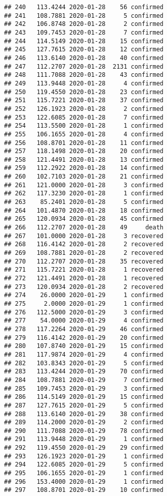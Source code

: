 \documentclass[
]{article}
\begin{document}
\begin{verbatim}
## 240   113.4244 2020-01-28    56 confirmed
## 241   108.7881 2020-01-28     5 confirmed
## 242   106.8748 2020-01-28     2 confirmed
## 243   109.7453 2020-01-28     7 confirmed
## 244   114.5149 2020-01-28    15 confirmed
## 245   127.7615 2020-01-28    12 confirmed
## 246   113.6140 2020-01-28    40 confirmed
## 247   112.2707 2020-01-28  2131 confirmed
## 248   111.7088 2020-01-28    43 confirmed
## 249   113.9448 2020-01-28     4 confirmed
## 250   119.4550 2020-01-28    23 confirmed
## 251   115.7221 2020-01-28    37 confirmed
## 252   126.1923 2020-01-28     2 confirmed
## 253   122.6085 2020-01-28     7 confirmed
## 254   113.5500 2020-01-28     1 confirmed
## 255   106.1655 2020-01-28     4 confirmed
## 256   108.8701 2020-01-28    11 confirmed
## 257   118.1498 2020-01-28    20 confirmed
## 258   121.4491 2020-01-28    13 confirmed
## 259   112.2922 2020-01-28    14 confirmed
## 260   102.7103 2020-01-28    21 confirmed
## 261   121.0000 2020-01-28     3 confirmed
## 262   117.3230 2020-01-28     1 confirmed
## 263    85.2401 2020-01-28     5 confirmed
## 264   101.4870 2020-01-28    18 confirmed
## 265   120.0934 2020-01-28    45 confirmed
## 266   112.2707 2020-01-28    49     death
## 267   101.0000 2020-01-28     3 recovered
## 268   116.4142 2020-01-28     2 recovered
## 269   108.7881 2020-01-28     2 recovered
## 270   112.2707 2020-01-28    35 recovered
## 271   115.7221 2020-01-28     1 recovered
## 272   121.4491 2020-01-28     1 recovered
## 273   120.0934 2020-01-28     2 recovered
## 274    26.0000 2020-01-29     1 confirmed
## 275     2.0000 2020-01-29     1 confirmed
## 276   112.5000 2020-01-29     3 confirmed
## 277    54.0000 2020-01-29     4 confirmed
## 278   117.2264 2020-01-29    46 confirmed
## 279   116.4142 2020-01-29    20 confirmed
## 280   107.8740 2020-01-29    15 confirmed
## 281   117.9874 2020-01-29     4 confirmed
## 282   103.8343 2020-01-29     5 confirmed
## 283   113.4244 2020-01-29    70 confirmed
## 284   108.7881 2020-01-29     7 confirmed
## 285   109.7453 2020-01-29     3 confirmed
## 286   114.5149 2020-01-29    15 confirmed
## 287   127.7615 2020-01-29     5 confirmed
## 288   113.6140 2020-01-29    38 confirmed
## 289   114.2000 2020-01-29     2 confirmed
## 290   111.7088 2020-01-29    78 confirmed
## 291   113.9448 2020-01-29     1 confirmed
## 292   119.4550 2020-01-29    29 confirmed
## 293   126.1923 2020-01-29     1 confirmed
## 294   122.6085 2020-01-29     5 confirmed
## 295   106.1655 2020-01-29     1 confirmed
## 296   153.4000 2020-01-29     1 confirmed
## 297   108.8701 2020-01-29    10 confirmed

\end{verbatim}
\end{document}
